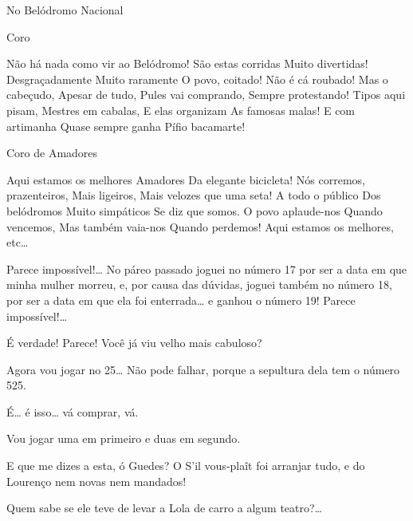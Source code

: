 
No Belódromo Nacional



 Coro

 Não há nada como 
 vir ao Belódromo! 
 São estas corridas 
 Muito divertidas! 
 Desgraçadamente 
 Muito raramente 
 O povo, coitado! 
 Não é cá roubado! 
 Mas o cabeçudo, 
 Apesar de tudo, 
 Pules vai comprando, 
 Sempre protestando! 
 Tipos aqui pisam, 
 Mestres em cabalas, 
 E elas organizam 
 As famosas malas! 
 E com artimanha 
 Quase sempre ganha 
 Pífio bacamarte! 

 Coro de Amadores

 Aqui estamos os melhores 
 Amadores 
 Da elegante bicicleta! 
 Nós corremos, prazenteiros, 
 Mais ligeiros, 
 Mais velozes que uma seta! 
 A todo o público 
 Dos belódromos 
 Muito simpáticos 
 Se diz que somos. 
 O povo aplaude-nos 
 Quando vencemos, 
 Mas também vaia-nos 
 Quando perdemos! 
 Aqui estamos os melhores, etc\ldots{}

  Parece impossível!\ldots{} No 
páreo passado joguei no número 17 por ser a data em que minha mulher
morreu, e, por causa das dúvidas, joguei também no número 18, por ser a data em que
ela foi enterrada\ldots{} e ganhou o número 19! Parece impossível!\ldots{}

 É verdade! Parece!  Você já viu velho mais cabuloso?

 Agora vou jogar no 25\ldots{} Não pode falhar, porque a
sepultura dela tem o número 525.

 É\ldots{} é isso\ldots{} vá comprar, vá.

 Vou jogar uma em primeiro e duas em segundo. 

 E que me dizes a esta, ó Guedes? O S’il vous-plaît foi arranjar
tudo, e do Lourenço nem novas nem mandados!

 Quem sabe se ele teve de levar a Lola de carro a algum teatro?\ldots{}

